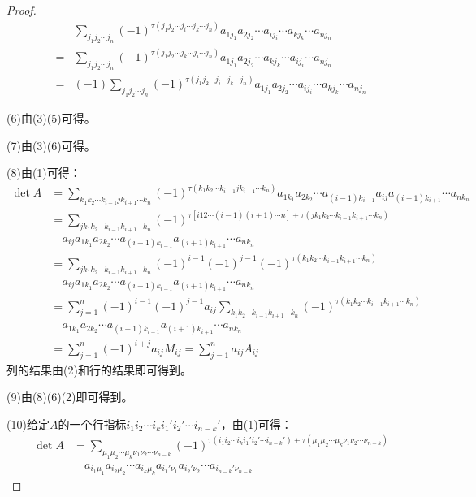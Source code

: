 \begin{proof}
\begin{align*}
		&\sum_{j_1j_2\cdots j_n}^{}(-1)^{\tau(j_1j_2\cdots j_i\cdots j_k\cdots j_n)}a_{1j_1}a_{2j_2}\cdots a_{ij_i}\cdots a_{kj_k}\cdots a_{nj_n} \\
		=&\sum_{j_1j_2\cdots j_n}^{}(-1)^{\tau(j_1j_2\cdots j_k\cdots j_i\cdots j_n)}a_{1j_1}a_{2j_2}\cdots a_{kj_k}\cdots a_{ij_i}\cdots a_{nj_n} \\
		=&(-1)\sum_{j_1j_2\cdots j_n}^{}(-1)^{\tau(j_1j_2\cdots j_i\cdots j_k\cdots j_n)}a_{1j_1}a_{2j_2}\cdots a_{ij_i}\cdots a_{kj_k}\cdots a_{nj_n}
	\end{align*}\par
	(6)由(3)(5)可得。\par
	(7)由(3)(6)可得。\par
	(8)由(1)可得：
	\begin{align*}
		\det A&=\sum_{k_1k_2\cdots k_{i-1}jk_{i+1}\cdots k_n}^{}(-1)^{\tau(k_1k_2\cdots k_{i-1}jk_{i+1}\cdots k_n)}a_{1k_1}a_{2k_2}\cdots a_{(i-1)k_{i-1}}a_{ij}a_{(i+1)k_{i+1}}\cdots a_{nk_n} \\
		&=\sum_{jk_1k_2\cdots k_{i-1}k_{i+1}\cdots k_n}^{}(-1)^{\tau[i12\cdots(i-1)(i+1)\cdots n]+\tau(jk_1k_2\cdots k_{i-1}k_{i+1}\cdots k_n)} \\
		&\quad a_{ij}a_{1k_1}a_{2k_2}\cdots a_{(i-1)k_{i-1}}a_{(i+1)k_{i+1}}\cdots a_{nk_n} \\
		&=\sum_{jk_1k_2\cdots k_{i-1}k_{i+1}\cdots k_n}^{}(-1)^{i-1}(-1)^{j-1}(-1)^{\tau(k_1k_2\cdots k_{i-1}k_{i+1}\cdots k_n)} \\
		&\quad a_{ij}a_{1k_1}a_{2k_2}\cdots a_{(i-1)k_{i-1}}a_{(i+1)k_{i+1}}\cdots a_{nk_n} \\
		&=\sum_{j=1}^{n}(-1)^{i-1}(-1)^{j-1}a_{ij}\sum_{k_1k_2\cdots k_{i-1}k_{i+1}\cdots k_n}(-1)^{\tau(k_1k_2\cdots k_{i-1}k_{i+1}\cdots k_n)} \\
		&\quad a_{1k_1}a_{2k_2}\cdots a_{(i-1)k_{i-1}}a_{(i+1)k_{i+1}}\cdots a_{nk_n} \\
		&=\sum_{j=1}^{n}(-1)^{i+j}a_{ij}M_{ij}=\sum_{j=1}^{n}a_{ij}A_{ij}
	\end{align*}
	列的结果由(2)和行的结果即可得到。\par
	(9)由(8)(6)(2)即可得到。\par
	(10)给定$A$的一个行指标$i_1i_2\cdots i_ki_1'i_2'\cdots i_{n-k}'$，由(1)可得：
	\begin{align*}
		\det A&=\sum_{\mu_1\mu_2\cdots\mu_k\nu_1\nu_2\cdots\nu_{n-k}}(-1)^{\tau(i_1i_2\cdots i_ki_1'i_2'\cdots i_{n-k}')+\tau(\mu_1\mu_2\cdots\mu_k\nu_1\nu_2\cdots\nu_{n-k})} \\
		&\quad a_{i_1\mu_1}a_{i_2\mu_2}\cdots a_{i_k\mu_k}a_{i_1'\nu_1}a_{i_2'\nu_2}\cdots a_{i_{n-k}'\nu_{n-k}}

\end{align*}
\end{proof}
